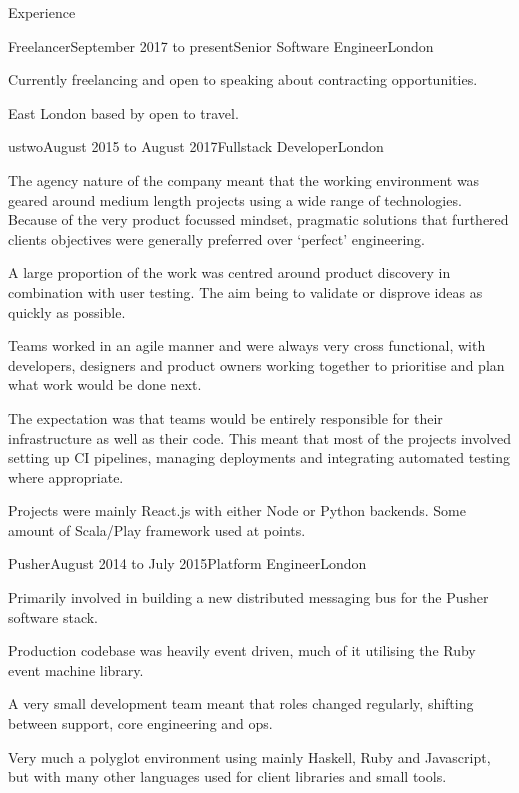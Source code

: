 \documentclass{resume} %
\begin{document}

\begin{rSection}{Experience}

  \begin{rExperience}{Freelancer}{September 2017 to present}{Senior Software Engineer}{London}
  \item Currently freelancing and open to speaking about contracting opportunities.
  \item East London based by open to travel.
  \end{rExperience}

  \begin{rExperience}{ustwo}{August 2015 to August 2017}{Fullstack Developer}{London}
  \item The agency nature of the company meant that the working environment was geared around medium length projects using a wide range of technologies. Because of the very product focussed mindset, pragmatic solutions that furthered clients objectives were generally preferred over `perfect' engineering.
  \item A large proportion of the work was centred around product discovery in combination with user testing. The aim being to validate or disprove ideas as quickly as possible.
  \item Teams worked in an agile manner and were always very cross functional, with developers, designers and product owners working together to prioritise and plan what work would be done next.
  \item The expectation was that teams would be entirely responsible for their infrastructure as well as their code. This meant that most of the projects involved setting up CI pipelines, managing deployments and integrating automated testing where appropriate.
  \item Projects were mainly React.js with either Node or Python backends. Some amount of Scala/Play framework used at points.
  \end{rExperience}


  \begin{rExperience}{Pusher}{August 2014 to July 2015}{Platform Engineer}{London}
  \item Primarily involved in building a new distributed messaging bus for the Pusher software stack.
  \item Production codebase was heavily event driven, much of it utilising the Ruby event machine library.
  \item A very small development team meant that roles changed regularly, shifting between support, core engineering and ops.
  \item Very much a polyglot environment using mainly Haskell, Ruby and Javascript, but with many other languages used for client libraries and small tools.
  \end{rExperience}


\end{rSection}
\end{document}
